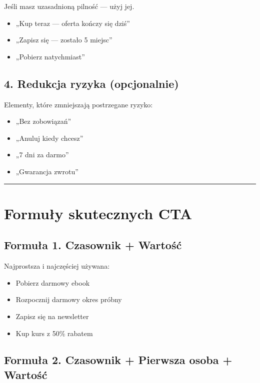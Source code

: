 \documentclass[
  12pt,
  a4paper,
  twoside,
  openright,
  12pt,
  DIV=12,
  BCOR=12mm]{scrbook}
\providecommand{\tightlist}{%
  \setlength{\itemsep}{0pt}\setlength{\parskip}{0pt}}\usepackage{longtable,booktabs,array}
\newcommand{\decoline}{%
  \begin{center}
    \textcolor{bordergray}{\rule{0.3\textwidth}{0.5pt}}
  \end{center}
}
\begin{document}
Jeśli masz uzasadnioną pilność --- użyj jej.

\begin{itemize}
\tightlist
\item
  „Kup teraz --- oferta kończy się dziś''
\item
  „Zapisz się --- zostało 5 miejsc''
\item
  „Pobierz natychmiast''
\end{itemize}

\subsection{4. Redukcja ryzyka
(opcjonalnie)}\label{redukcja-ryzyka-opcjonalnie}

Elementy, które zmniejszają postrzegane ryzyko:

\begin{itemize}
\tightlist
\item
  „Bez zobowiązań''
\item
  „Anuluj kiedy chcesz''
\item
  „7 dni za darmo''
\item
  „Gwarancja zwrotu''
\end{itemize}

\decoline

\section{Formuły skutecznych CTA}\label{formuux142y-skutecznych-cta}

\subsection{Formuła 1. Czasownik +
Wartość}\label{formuux142a-1.-czasownik-wartoux15bux107}

Najprostsza i najczęściej używana:

\begin{itemize}
\tightlist
\item
  Pobierz darmowy ebook
\item
  Rozpocznij darmowy okres próbny
\item
  Zapisz się na newsletter
\item
  Kup kurs z 50\% rabatem
\end{itemize}

\subsection{Formuła 2. Czasownik + Pierwsza osoba +
Wartość}\label{formuux142a-2.-czasownik-pierwsza-osoba-wartoux15bux107}
\end{document}
